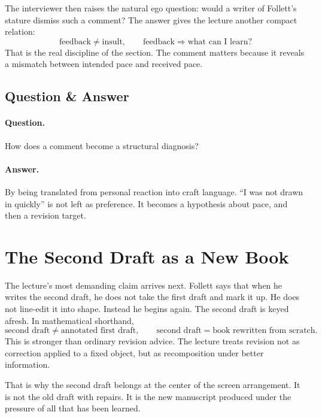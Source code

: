 The interviewer then raises the natural ego question: would a writer of Follett's stature dismiss such a comment? The answer gives the lecture another compact relation:
\begin{equation}
\text{feedback} \neq \text{insult}, \qquad
\text{feedback} \Rightarrow \text{what can I learn?}
\end{equation}
That is the real discipline of the section. The comment matters because it reveals a mismatch between intended pace and received pace.

\subsection{Question \& Answer}

\paragraph{Question.} How does a comment become a structural diagnosis?

\paragraph{Answer.} By being translated from personal reaction into craft language. ``I was not drawn in quickly'' is not left as preference. It becomes a hypothesis about pace, and then a revision target.

\section{The Second Draft as a New Book}

The lecture's most demanding claim arrives next. Follett says that when he writes the second draft, he does not take the first draft and mark it up. He does not line-edit it into shape. Instead he begins again. The second draft is keyed afresh. In mathematical shorthand,
\begin{equation}
\text{second draft} \neq \text{annotated first draft}, \qquad
\text{second draft} = \text{book rewritten from scratch}.
\end{equation}
This is stronger than ordinary revision advice. The lecture treats revision not as correction applied to a fixed object, but as recomposition under better information.

That is why the second draft belongs at the center of the screen arrangement. It is not the old draft with repairs. It is the new manuscript produced under the pressure of all that has been learned.

